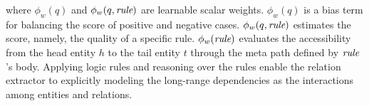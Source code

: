 \documentclass[11pt]{article}
\begin{document}
{where $\phi_w({q})$ and $\phi_w({q}, \emph{rule})$ are learnable scalar weights.
$\phi_w({q})$ is a bias term for balancing the score of positive and negative cases.
$\phi_w({q}, \emph{rule})$ estimates the score, namely, the quality of a specific rule.
$\phi_w(\emph{rule})$ evaluates the accessibility from the head entity $h$ to the tail entity $ t$ through the meta path defined by $\emph{rule}$'s body.
Applying logic rules and reasoning over the rules enable the relation extractor to explicitly modeling the long-range dependencies as the interactions among entities and relations.




















}
\end{document}
